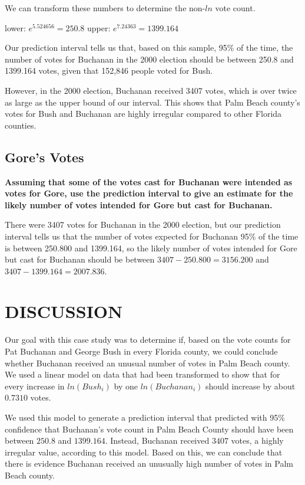 \documentclass[
  letterpaper,
  DIV=11,
  numbers=noendperiod]{scrartcl}
\begin{document}
We can transform these numbers to determine the non-\(ln\) vote count.

lower: \(e^{5.524656} = 250.8\) upper: \(e^{7.24363} = 1399.164\)

Our prediction interval tells us that, based on this sample, 95\% of the
time, the number of votes for Buchanan in the 2000 election should be
between 250.8 and 1399.164 votes, given that 152,846 people voted for
Bush.

However, in the 2000 election, Buchanan received 3407 votes, which is
over twice as large as the upper bound of our interval. This shows that
Palm Beach county's votes for Bush and Buchanan are highly irregular
compared to other Florida counties.

\hypertarget{gores-votes}{%
\subsection{Gore's Votes}\label{gores-votes}}

\textbf{Assuming that some of the votes cast for Buchanan were intended
as votes for Gore, use the prediction interval to give an estimate for
the likely number of votes intended for Gore but cast for Buchanan.}

There were 3407 votes for Buchanan in the 2000 election, but our
prediction interval tells us that the number of votes expected for
Buchanan 95\% of the time is between 250.800 and 1399.164, so the likely
number of votes intended for Gore but cast for Buchanan should be
between \(3407-250.800 = 3156.200\) and \(3407-1399.164 = 2007.836\).

\hypertarget{discussion}{%
\section{DISCUSSION}\label{discussion}}

Our goal with this case study was to determine if, based on the vote
counts for Pat Buchanan and George Bush in every Florida county, we
could conclude whether Buchanan received an unusual number of votes in
Palm Beach county. We used a linear model on data that had been
transformed to show that for every increase in \(ln(Bush_i)\) by one
\(ln(Buchanan_i)\) should increase by about \(0.7310\) votes.

We used this model to generate a prediction interval that predicted with
95\% confidence that Buchanan's vote count in Palm Beach County should
have been between \(250.8\) and \(1399.164\). Instead, Buchanan received
\(3407\) votes, a highly irregular value, according to this model. Based
on this, we can conclude that there is evidence Buchanan received an
unusually high number of votes in Palm Beach county.
\end{document}
